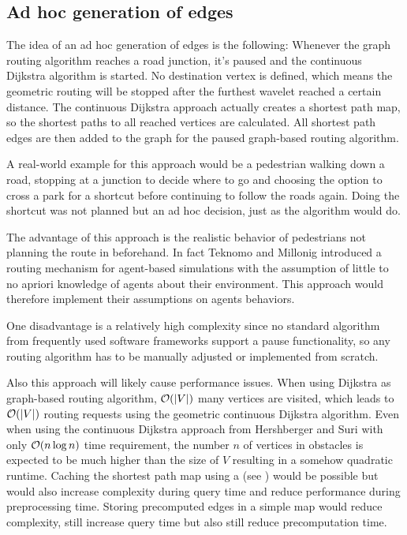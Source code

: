 	\subsection{Ad hoc generation of edges}
	
		The idea of an ad hoc generation of edges is the following:
		Whenever the graph routing algorithm reaches a road junction, it's paused and the continuous Dijkstra algorithm is started.
		No destination vertex is defined, which means the geometric routing will be stopped after the furthest wavelet reached a certain distance.
		The continuous Dijkstra approach actually creates a shortest path map, so the shortest paths to all reached vertices are calculated.
		All shortest path edges are then added to the graph for the paused graph-based routing algorithm.
		
		A real-world example for this approach would be a pedestrian walking down a road, stopping at a junction to decide where to go and choosing the option to cross a park for a shortcut before continuing to follow the roads again.
		Doing the shortcut was not planned but an ad hoc decision, just as the algorithm would do.
		
		The advantage of this approach is the realistic behavior of pedestrians not planning the route in beforehand.
		In fact Teknomo and Millonig introduced a routing mechanism for agent-based simulations with the assumption of little to no apriori knowledge of agents about their environment\cite{teknomo-millonig-routing}.
		This approach would therefore implement their assumptions on agents behaviors.
		
		One disadvantage is a relatively high complexity since no standard algorithm from frequently used software frameworks support a pause functionality, so any routing algorithm has to be manually adjusted or implemented from scratch.
		
		Also this approach will likely cause performance issues.
		When using Dijkstra as graph-based routing algorithm, $\mathcal{O}(|V|)$ many vertices are visited, which leads to $\mathcal{O}(|V|)$ routing requests using the geometric continuous Dijkstra algorithm.
		Even when using the continuous Dijkstra approach from Hershberger and Suri\cite{hershberger-suri} with only $\mathcal{O}(n \log n)$ time requirement, the number $n$ of vertices in obstacles is expected to be much higher than the size of $V$ resulting in a somehow quadratic runtime.
		Caching the shortest path map using a  (see ) would be possible but would also increase complexity during query time and reduce performance during preprocessing time.
		Storing precomputed edges in a simple map would reduce complexity, still increase query time but also still reduce precomputation time.
		
